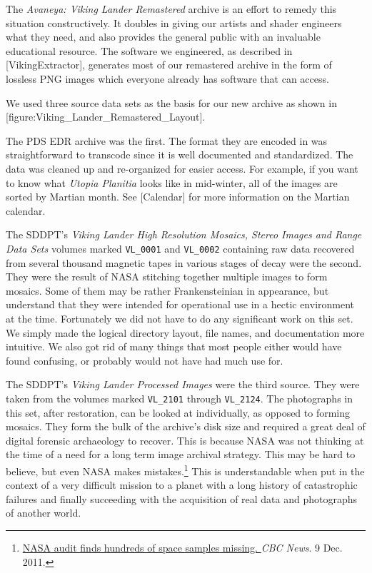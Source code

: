 The {\it Avaneya: Viking Lander Remastered} archive is an effort to remedy this situation constructively. It doubles in giving our artists and shader engineers what they need, and also provides the general public with an invaluable educational resource. The software we engineered, as described in [VikingExtractor], generates most of our remastered archive in the form of lossless PNG images which everyone already has software that can access.

We used three source data sets as the basis for our new archive as shown in [figure:Viking_Lander_Remastered_Layout].
\crlf

    {}

The PDS EDR archive was the first. The format they are encoded in was straightforward to transcode since it is well documented and standardized. The data was cleaned up and re-organized for easier access. For example, if you want to know what {\it Utopia Planitia} looks like in mid-winter, all of the images are sorted by Martian month. See [Calendar] for more information on the Martian calendar.

The SDDPT's {\it Viking Lander High Resolution Mosaics, Stereo Images and Range Data Sets} volumes marked {\tt VL_0001} and {\tt VL_0002} containing raw data recovered from several thousand magnetic tapes in various stages of decay were the second. They were the result of NASA stitching together multiple images to form mosaics. Some of them may be rather Frankensteinian in appearance, but understand that they were intended for operational use in a hectic environment at the time. Fortunately we did not have to do any significant work on this set. We simply made the logical directory layout, file names, and documentation more intuitive. We also got rid of many things that most people either would have found confusing, or probably would not have had much use for.

The SDDPT's {\it Viking Lander Processed Images} were the third source. They were taken from the volumes marked {\tt VL_2101} through {\tt VL_2124}. The photographs in this set, after restoration, can be looked at individually, as opposed to forming mosaics. They form the bulk of the archive's disk size and required a great deal of digital forensic archaeology to recover. This is because NASA was not thinking at the time of a need for a long term image archival strategy. This may be hard to believe, but even NASA makes mistakes.\footnote{\href{http://www.cbc.ca/news/technology/story/2011/12/09/science-missing-space-samples-nasa.html?cmp=rss}{NASA audit finds hundreds of space samples missing. }{\it CBC News}. 9 Dec. 2011.} This is understandable when put in the context of a very difficult mission to a planet with a long history of catastrophic failures and finally succeeding with the acquisition of real data and photographs of another world.

